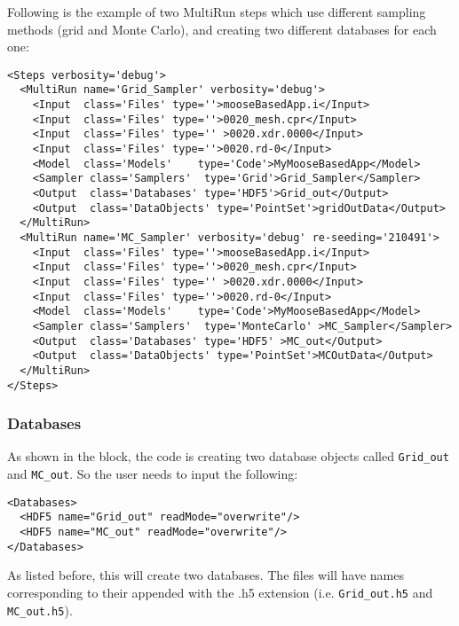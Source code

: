 Following is the example of two MultiRun steps which use different sampling
methods (grid and Monte Carlo), and creating two different databases for each
one:
\begin{lstlisting}[style=XML]
<Steps verbosity='debug'>
  <MultiRun name='Grid_Sampler' verbosity='debug'>
    <Input  class='Files' type=''>mooseBasedApp.i</Input>
    <Input  class='Files' type=''>0020_mesh.cpr</Input>
    <Input  class='Files' type='' >0020.xdr.0000</Input>
    <Input  class='Files' type=''>0020.rd-0</Input>
    <Model  class='Models'    type='Code'>MyMooseBasedApp</Model>
    <Sampler class='Samplers'  type='Grid'>Grid_Sampler</Sampler>
    <Output  class='Databases' type='HDF5'>Grid_out</Output>
    <Output  class='DataObjects' type='PointSet'>gridOutData</Output>
  </MultiRun>
  <MultiRun name='MC_Sampler' verbosity='debug' re-seeding='210491'>
    <Input  class='Files' type=''>mooseBasedApp.i</Input>
    <Input  class='Files' type=''>0020_mesh.cpr</Input>
    <Input  class='Files' type='' >0020.xdr.0000</Input>
    <Input  class='Files' type=''>0020.rd-0</Input>
    <Model  class='Models'    type='Code'>MyMooseBasedApp</Model>
    <Sampler class='Samplers'  type='MonteCarlo' >MC_Sampler</Sampler>
    <Output  class='Databases' type='HDF5' >MC_out</Output>
    <Output  class='DataObjects' type='PointSet'>MCOutData</Output>
  </MultiRun>
</Steps>
\end{lstlisting}
\subsubsection{Databases}
As shown in the  block, the code is creating two database objects
called \texttt{Grid\_out} and \texttt{MC\_out}.
%
So the user needs to input the following:
\begin{lstlisting}[style=XML]
<Databases>
  <HDF5 name="Grid_out" readMode="overwrite"/>
  <HDF5 name="MC_out" readMode="overwrite"/>
</Databases>
\end{lstlisting}
As listed before, this will create two databases.
%
The files will have names corresponding to their  appended with
the .h5 extension (i.e. \texttt{Grid\_out.h5} and \texttt{MC\_out.h5}).

